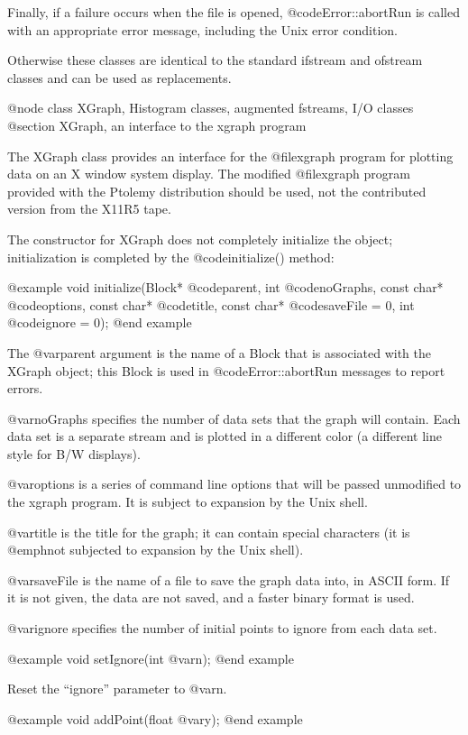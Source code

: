 Finally, if a failure occurs when the file is opened,
@code{Error::abortRun} is called with an appropriate error message,
including the Unix error condition.

Otherwise these classes are identical to the standard ifstream and
ofstream classes and can be used as replacements.

@node class XGraph, Histogram classes, augmented fstreams, I/O classes
@section XGraph, an interface to the xgraph program

The XGraph class provides an interface for the @file{xgraph} program for
plotting data on an X window system display.  The modified @file{xgraph}
program provided with the Ptolemy distribution should be used, not the
contributed version from the X11R5 tape.

The constructor for XGraph does not completely initialize the object;
initialization is completed by the @code{initialize()} method:

@example
void initialize(Block* @code{parent}, int @code{noGraphs},
     const char* @code{options}, const char* @code{title},
     const char* @code{saveFile} = 0, int @code{ignore} = 0);
@end example

The @var{parent} argument is the name of a Block that is associated
with the XGraph object; this Block is used in @code{Error::abortRun}
messages to report errors.

@var{noGraphs} specifies the number of data sets that the graph will
contain.  Each data set is a separate stream and is plotted in a
different color (a different line style for B/W displays).

@var{options} is a series of command line options that will be passed
unmodified to the xgraph program.  It is subject to expansion by the
Unix shell.

@var{title} is the title for the graph; it can contain special
characters (it is @emph{not} subjected to expansion by the Unix shell).

@var{saveFile} is the name of a file to save the graph data into, in
ASCII form.  If it is not given, the data are not saved, and a faster
binary format is used.

@var{ignore} specifies the number of initial points to ignore from
each data set.

@example
void setIgnore(int @var{n});
@end example

Reset the ``ignore'' parameter to @var{n}.

@example
void addPoint(float @var{y});
@end example

